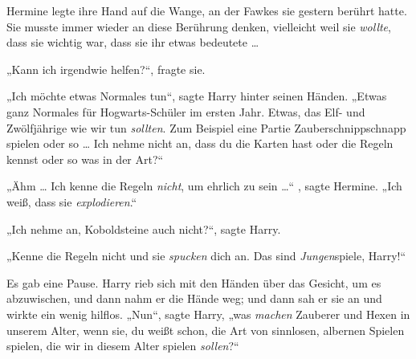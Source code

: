 Hermine legte ihre Hand auf die Wange, an der Fawkes sie gestern berührt hatte. Sie musste immer wieder an diese Berührung denken, vielleicht weil sie \emph{wollte}, dass sie wichtig war, dass sie ihr etwas bedeutete …

„Kann ich irgendwie helfen?“, fragte sie.

„Ich möchte etwas Normales tun“, sagte Harry hinter seinen Händen.
„Etwas ganz Normales für Hogwarts-Schüler im ersten Jahr. Etwas, das Elf- und Zwölfjährige wie wir tun \emph{sollten}. Zum Beispiel eine Partie Zauberschnippschnapp spielen oder so … Ich nehme nicht an, dass du die Karten hast oder die Regeln kennst oder so was in der Art?“

„Ähm … Ich kenne die Regeln \emph{nicht}, um ehrlich zu sein …“ , sagte Hermine.
„Ich weiß, dass sie \emph{explodieren}.“

„Ich nehme an, Koboldsteine auch nicht?“, sagte Harry.

„Kenne die Regeln nicht und sie \emph{spucken} dich an. Das sind \emph{Jungen}{}spiele, Harry!“

Es gab eine Pause. Harry rieb sich mit den Händen über das Gesicht, um es abzuwischen, und dann nahm er die Hände weg; und dann sah er sie an und wirkte ein wenig hilflos.
„Nun“, sagte Harry, „was \emph{machen} Zauberer und Hexen in unserem Alter, wenn sie, du weißt schon, die Art von sinnlosen, albernen Spielen spielen, die wir in diesem Alter spielen \emph{sollen}?“

